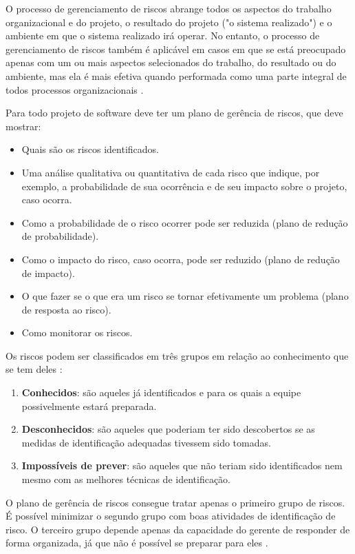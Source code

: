 \documentclass[
	12pt,
	openright,
	twoside,
	a4paper,
	english,
	brazil
	]{abntex2}
\begin{document}
O processo de gerenciamento de riscos abrange todos os aspectos do trabalho organizacional e do projeto, o resultado do projeto ("o sistema realizado") e o ambiente em que o sistema realizado irá operar. No entanto, o processo de gerenciamento de riscos também é aplicável em casos em que se está preocupado apenas com um ou mais aspectos selecionados do trabalho, do resultado ou do ambiente, mas ela é mais efetiva quando performada como uma parte integral de todos processos organizacionais \cite{iso16085}.

Para  todo projeto de software deve ter um plano de gerência de riscos, que deve mostrar:

\begin{itemize}
  \item Quais são os riscos identificados.  
  \item Uma análise qualitativa ou quantitativa de cada risco que indique, por exemplo, a probabilidade de sua ocorrência e de seu impacto sobre o projeto, caso ocorra.  
  \item Como a probabilidade de o risco ocorrer pode ser reduzida (plano de redução de probabilidade).  
  \item Como o impacto do risco, caso ocorra, pode ser reduzido (plano de redução de impacto).  
  \item O que fazer se o que era um risco se tornar efetivamente um problema (plano de resposta ao risco).  
  \item Como monitorar os riscos.
\end{itemize}

Os riscos podem ser classificados em três grupos em relação ao conhecimento que se tem deles \cite{wazlawick2019}:

\begin{enumerate}
  \item \textbf{Conhecidos}: são aqueles já identificados e para os quais a equipe possivelmente estará preparada.  
  \item \textbf{Desconhecidos}: são aqueles que poderiam ter sido descobertos se as medidas de identificação adequadas tivessem sido tomadas.  
  \item \textbf{Impossíveis de prever}: são aqueles que não teriam sido identificados nem mesmo com as melhores técnicas de identificação.
\end{enumerate}

O plano de gerência de riscos consegue tratar apenas o primeiro grupo de riscos. É possível minimizar o segundo grupo com boas atividades de identificação de risco. O terceiro grupo depende apenas da capacidade do gerente de responder de forma organizada, já que não é possível se preparar para eles \cite{wazlawick2019}.
\end{document}
